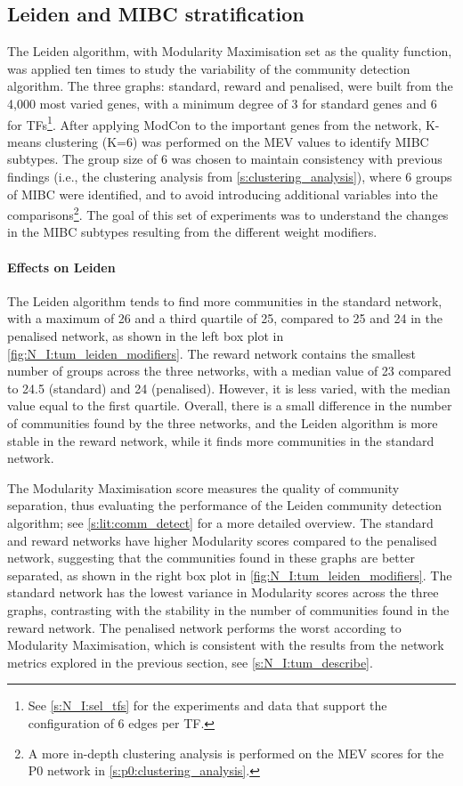 \subsection{Leiden and MIBC stratification} \label{s:N_I:tum_stratification}

The Leiden algorithm, with Modularity Maximisation set as the quality function, was applied ten times to study the variability of the community detection algorithm. The three graphs: standard, reward and penalised, were built from the 4,000 most varied genes, with a minimum degree of 3 for standard genes and 6 for TFs\footnote{See \cref{s:N_I:sel_tfs} for the experiments and data that support the configuration of 6 edges per TF.}. After applying ModCon to the important genes from the network, K-means clustering (K=6) was performed on the MEV values to identify MIBC subtypes. The group size of 6 was chosen to maintain consistency with previous findings (i.e., the clustering analysis from \cref{s:clustering_analysis}), where 6 groups of MIBC were identified, and to avoid introducing additional variables into the comparisons\footnote{A more in-depth clustering analysis is performed on the MEV scores for the P0 network in \cref{s:p0:clustering_analysis}.}. The goal of this set of experiments was to understand the changes in the MIBC subtypes resulting from the different weight modifiers.


\paragraph*{Effects on Leiden}
The Leiden algorithm tends to find more communities in the standard network, with a maximum of 26 and a third quartile of 25, compared to 25 and 24 in the penalised network, as shown in the left box plot in \cref{fig:N_I:tum_leiden_modifiers}. The reward network contains the smallest number of groups across the three networks, with a median value of 23 compared to 24.5 (standard) and 24 (penalised). However, it is less varied, with the median value equal to the first quartile. Overall, there is a small difference in the number of communities found by the three networks, and the Leiden algorithm is more stable in the reward network, while it finds more communities in the standard network.

The Modularity Maximisation score measures the quality of community separation, thus evaluating the performance of the Leiden community detection algorithm; see \cref{s:lit:comm_detect} for a more detailed overview. The standard and reward networks have higher Modularity scores compared to the penalised network, suggesting that the communities found in these graphs are better separated, as shown in the right box plot in \cref{fig:N_I:tum_leiden_modifiers}. The standard network has the lowest variance in Modularity scores across the three graphs, contrasting with the stability in the number of communities found in the reward network. The penalised network performs the worst according to Modularity Maximisation, which is consistent with the results from the network metrics explored in the previous section, see \cref{s:N_I:tum_describe}.

